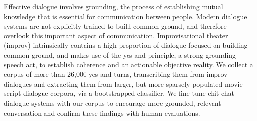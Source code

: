 Effective dialogue involves grounding, the process of establishing mutual knowledge that is essential for communication between people. Modern dialogue systems are not explicitly trained to build common ground, and therefore overlook this important aspect of communication. Improvisational theater (improv) intrinsically contains a high proportion of dialogue focused on building common ground, and makes use of the yes-and principle, a strong grounding speech act, to establish coherence and an actionable objective reality. We collect a corpus of more than 26,000 yes-and turns, transcribing them from improv dialogues and extracting them from larger, but more sparsely populated movie script dialogue corpora, via a bootstrapped classifier. We fine-tune chit-chat dialogue systems with our corpus to encourage more grounded, relevant conversation and confirm these findings with human evaluations.
